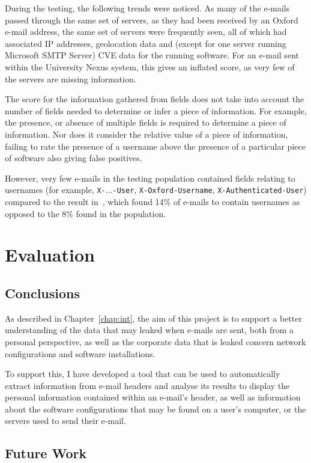 During the testing, the following trends were noticed.  As many of the e-mails
passed through the same set of servers, as they had been received by an Oxford
e-mail address, the same set of servers were frequently seen, all of which had
associated IP addresses, geolocation data and (except for one server running
Microsoft SMTP Server) CVE data for the running software.  For an e-mail sent
within the University Nexus system, this gives an inflated score, as very few
of the servers are missing information.

The score for the information gathered from fields does not take into account
the number of fields needed to determine or infer a piece of information. For
example, the presence, or absence of multiple fields is required to determine a
piece of information.  Nor does it consider the relative value of a piece of
information, failing to rate the presence of a username above the presence of a
particular piece of software also giving false positives.

However, very few e-mails in the testing population contained fields relating
to usernames (for example, \texttt{X-}$\ldots$\texttt{-User}, \texttt{X-Oxford-Username},
\texttt{X-Authenticated-User}) compared to the result
in~\cite{nurse2015investigating}, which found 14\% of e-mails to contain
usernames as opposed to the 8\% found in the population.

\cleardoublepage \chapter{Evaluation}
\section{Conclusions}

As described in Chapter~\ref{chap:int}, the aim of this project is to support a
better understanding of the data that may leaked when e-mails are sent, both
from a personal perspective, as well as the corporate data that is leaked
concern network configurations and software installations.

To support this, I have developed a tool that can be used to automatically
extract information from e-mail headers and analyse its results to display the
personal information contained within an e-mail's header, as well as
information about the software configurations that may be found on a user's
computer, or the servers used to send their e-mail.


\section{Future Work}

